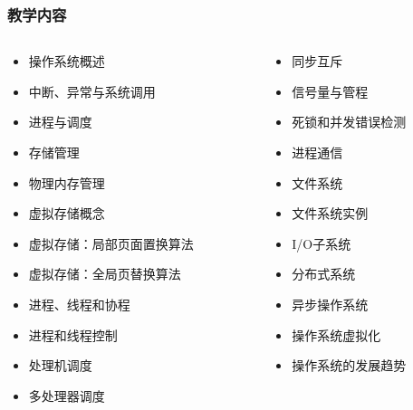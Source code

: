 \begin{frame}
	\frametitle{教学内容}

	\begin{columns}
    \begin{column}{0.6\textwidth}
        \begin{itemize}
            \item 操作系统概述
            \item 中断、异常与系统调用
            \item 进程与调度
            \item 存储管理
            \item 物理内存管理
            \item 虚拟存储概念
            \item 虚拟存储：局部页面置换算法
            \item 虚拟存储：全局页替换算法
            \item 进程、线程和协程
            \item 进程和线程控制
            \item 处理机调度
            \item 多处理器调度
        \end{itemize}
    \end{column}
	
	\begin{column}{0.4\textwidth}
    \begin{itemize}
        \item 同步互斥
        \item 信号量与管程
        \item 死锁和并发错误检测
        \item 进程通信
        \item 文件系统
        \item 文件系统实例
        \item I/O子系统
        \item 分布式系统
        \item 异步操作系统
        \item 操作系统虚拟化
        \item 操作系统的发展趋势
    \end{itemize}
    
    \end{column}

\end{columns}

\end{frame}

